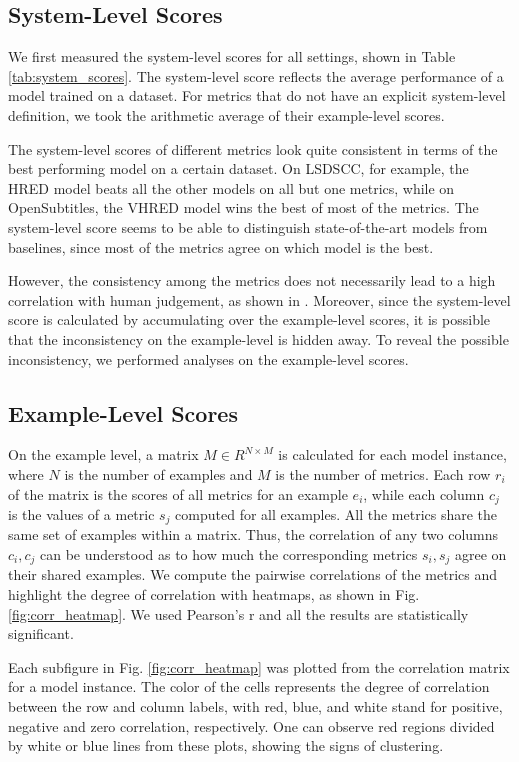 \documentclass[runningheads]{llncs}
\begin{document}
\subsection{System-Level Scores}
We first measured the system-level scores for all settings, shown in Table \ref{tab:system_scores}. The system-level score reflects the average performance of a model trained on a dataset. For metrics that do not have an explicit system-level definition, we took the arithmetic average of their example-level scores.


The system-level scores of different metrics look quite consistent in terms of the best performing model on a certain dataset. On LSDSCC, for example, the HRED model beats all the other models on all but one metrics, while on OpenSubtitles, the VHRED model wins the best of most of the metrics. The system-level score seems to be able to distinguish state-of-the-art models from baselines, since most of the metrics agree on which model is the best.

    However, the consistency among the metrics does not necessarily lead to a high correlation with human judgement, as shown in \cite{HowNot}. Moreover, since the system-level score is calculated by accumulating over the example-level scores, it is possible that the inconsistency on the example-level is hidden away. To reveal the possible inconsistency, we performed analyses on the example-level scores.

    \subsection{Example-Level Scores}
    On the example level, a matrix $M \in R^{N \times M}$ is calculated for each model instance, where $N$ is the number of examples and $M$ is the number of metrics. Each row $r_i$ of the matrix is the scores of all metrics for an example $e_i$, while each column $c_j$ is the values of a metric $s_j$ computed for all examples. All the metrics share the same set of examples within a matrix. Thus, the correlation of any two columns $c_i, c_j$ can be understood as to how much the corresponding metrics $s_i, s_j$ agree on their shared examples. We compute the pairwise correlations of the metrics and highlight the degree of correlation with heatmaps, as shown in Fig. \ref{fig:corr_heatmap}. We used Pearson's r and all the results are statistically significant.

    

    Each subfigure in Fig. \ref{fig:corr_heatmap} was plotted from the correlation matrix for a model instance. The color of the cells represents the degree of correlation between the row and column labels, with red, blue, and white stand for positive, negative and zero correlation, respectively. One can observe red regions divided by white or blue lines from these plots, showing the signs of clustering.
\end{document}
